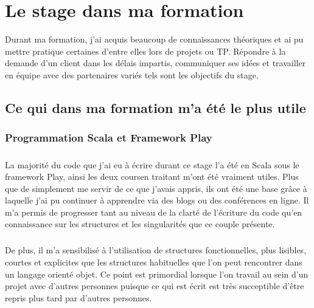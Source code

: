 
\chapter{Le stage dans ma formation} %

\label{formation} %


Durant ma formation, j’ai acquis beaucoup de connaissances théoriques et ai pu mettre pratique certaines d’entre elles lors de projets ou TP.
Répondre à la demande d’un client dans les délais impartis, communiquer ses idées et travailler en équipe avec des partenaires variés tels sont les objectifs du stage.


\section{Ce qui dans ma formation m'a été le plus utile}

\subsection{Programmation Scala et Framework Play}
\label{sub:Programmation Scala et Framework Play}
\paragraph{}
La majorité du code que j'ai eu à écrire durant ce stage l'a été en Scala sous le framework Play, ainsi les deux coursen traitant m'ont été vraiment utiles.
Plus que de simplement me servir de ce que j'avais appris, ils ont été une base grâce à laquelle j'ai pu continuer à apprendre via des blogs ou des conférences en ligne.
Il m'a permis de progresser tant au niveau de la clarté de l'écriture du code qu'en connaissance sur les structures et les singularités que ce couple présente.
\paragraph{}
De plus, il m'a sensibilisé à l'utilisation de structures fonctionnelles, plus lisibles, courtes et explicites que les structures habituelles que l'on peut rencontrer dans un langage orienté objet.
Ce point est primordial lorsque l'on travail au sein d'un projet avec d'autres personnes puisque ce qui est écrit est très succeptible d'être repris plus tard par d'autres personnes.

